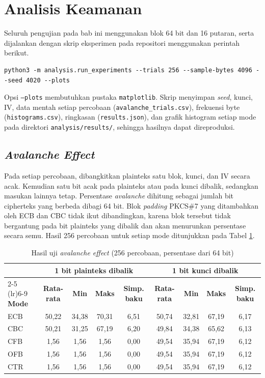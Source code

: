 \section{Analisis Keamanan}
Seluruh pengujian pada bab ini menggunakan blok 64 bit dan 16 putaran, serta dijalankan dengan skrip eksperimen pada repositori menggunakan perintah berikut.

\begin{lstlisting}[basicstyle=\ttfamily\small,breaklines=true]
python3 -m analysis.run_experiments --trials 256 --sample-bytes 4096 --seed 4020 --plots
\end{lstlisting}

Opsi \texttt{--plots} membutuhkan pustaka \texttt{matplotlib}. Skrip menyimpan \textit{seed}, kunci, IV, data mentah setiap percobaan (\texttt{avalanche\_trials.csv}), frekuensi byte (\texttt{histograms.csv}), ringkasan (\texttt{results.json}), dan grafik histogram setiap mode pada direktori \texttt{analysis/results/}, sehingga hasilnya dapat direproduksi.

\subsection{\textit{Avalanche Effect}}
Pada setiap percobaan, dibangkitkan plainteks satu blok, kunci, dan IV secara acak. Kemudian satu bit acak pada plainteks atau pada kunci dibalik, sedangkan masukan lainnya tetap. Persentase \textit{avalanche} dihitung sebagai jumlah bit cipherteks yang berbeda dibagi 64 bit. Blok \textit{padding} PKCS\#7 yang ditambahkan oleh ECB dan CBC tidak ikut dibandingkan, karena blok tersebut tidak bergantung pada bit plainteks yang dibalik dan akan menurunkan persentase secara semu. Hasil 256 percobaan untuk setiap mode ditunjukkan pada Tabel \ref{tab:avalanche}.

\begin{table}[H]
    \centering
    \footnotesize
    \caption{Hasil uji \textit{avalanche effect} (256 percobaan, persentase dari 64 bit)}
    \label{tab:avalanche}
    \begin{tabular}{@{}lcccccccc@{}}
        \toprule
        & \multicolumn{4}{c}{\textbf{1 bit plainteks dibalik}} & \multicolumn{4}{c}{\textbf{1 bit kunci dibalik}} \\
        \cmidrule(lr){2-5} \cmidrule(lr){6-9}
        \textbf{Mode} & \textbf{Rata-rata} & \textbf{Min} & \textbf{Maks} & \textbf{Simp. baku} & \textbf{Rata-rata} & \textbf{Min} & \textbf{Maks} & \textbf{Simp. baku} \\
        \midrule
        ECB & 50,22 & 34,38 & 70,31 & 6,51 & 50,74 & 32,81 & 67,19 & 6,17 \\
        CBC & 50,21 & 31,25 & 67,19 & 6,20 & 49,84 & 34,38 & 65,62 & 6,13 \\
        CFB & 1,56 & 1,56 & 1,56 & 0,00 & 49,54 & 35,94 & 67,19 & 6,12 \\
        OFB & 1,56 & 1,56 & 1,56 & 0,00 & 49,54 & 35,94 & 67,19 & 6,12 \\
        CTR & 1,56 & 1,56 & 1,56 & 0,00 & 49,54 & 35,94 & 67,19 & 6,12 \\
        \bottomrule
    \end{tabular}
\end{table}

